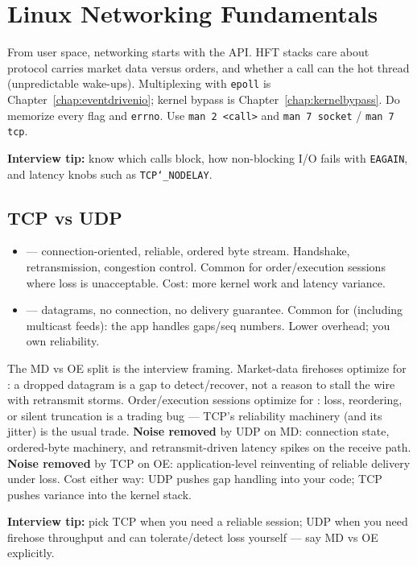 \chapter{Linux Networking Fundamentals}
\label{chap:linuxnetworking}

From user space, networking starts with the  API. 
HFT stacks care about  protocol carries market data versus orders, 
and whether a call can  the hot thread (unpredictable wake-ups). 
Multiplexing with \texttt{epoll} is Chapter~\ref{chap:eventdrivenio}; kernel bypass is 
Chapter~\ref{chap:kernelbypass}.
\newline
Do  memorize every flag and \texttt{errno}. Use \texttt{man 2 <call>} and 
\texttt{man 7 socket} / \texttt{man 7 tcp}.
\par\noindent\textbf{Interview tip:} know which calls 
block, how non-blocking I/O fails with \texttt{EAGAIN}, and latency knobs such as 
\texttt{TCP\char`_NODELAY}.

\section{TCP vs UDP}
\label{sec:tcp-vs-udp}
\begin{itemize}
    \item {} --- connection-oriented, reliable, ordered byte stream. 
          Handshake, retransmission, congestion control. Common for order/execution 
          sessions where loss is unacceptable. Cost: more kernel work and latency variance.
    \item {} --- datagrams, no connection, no delivery guarantee. 
          Common for  (including multicast feeds): the app handles 
          gaps/seq numbers. Lower overhead; you own reliability.
\end{itemize}
The MD vs OE split is the interview framing. Market-data firehoses optimize for 
: a dropped datagram is a gap to detect/recover, not a reason to 
stall the wire with retransmit storms. Order/execution sessions optimize for 
: loss, reordering, or silent truncation is a trading 
bug --- TCP's reliability machinery (and its jitter) is the usual trade.
\newline
\textbf{Noise removed} by UDP on MD: connection state, ordered-byte machinery, and 
retransmit-driven latency spikes on the receive path. \textbf{Noise removed} by TCP on OE: 
application-level reinventing of reliable delivery under loss. Cost either way: UDP pushes 
gap handling into your code; TCP pushes variance into the kernel stack.
\par\noindent\textbf{Interview tip:} pick TCP when you need a reliable session; UDP when you need 
firehose throughput and can tolerate/detect loss yourself --- say MD vs OE explicitly.

